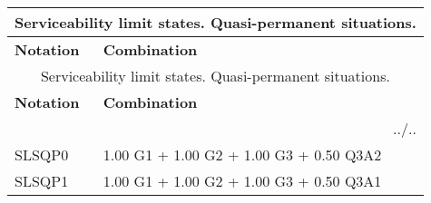 \begin{center}
\begin{small}
\begin{longtable}{|l|p{10cm}|}
\hline
\multicolumn{2}{|c|}{Serviceability limit states. Quasi-permanent situations.}\\
\hline
\textbf{Notation} & \textbf{Combination} \\
\hline
\endfirsthead
\hline
\multicolumn{2}{|c|}{Serviceability limit states. Quasi-permanent situations.}\\
\hline
\textbf{Notation} & \textbf{Combination} \\
\hline
\endhead
\hline \multicolumn{2}{|r|}{{../..}} \\ \hline
\endfoot
\hline
\endlastfoot
SLSQP0 & 1.00 G1 + 1.00 G2 + 1.00 G3 + 0.50 Q3A2\\
SLSQP1 & 1.00 G1 + 1.00 G2 + 1.00 G3 + 0.50 Q3A1\\
\hline
\end{longtable}
\end{small}
\end{center}
